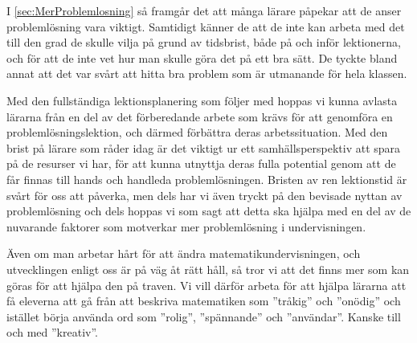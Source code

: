 
\textcolor{Mahogany}{
    I \ref{sec:MerProblemlosning} så framgår det att många lärare påpekar att de anser problemlösning vara viktigt. Samtidigt känner de att de inte kan arbeta med det till den grad de skulle vilja på grund av tidsbrist, både på och inför lektionerna, och för att de inte vet hur man skulle göra det på ett bra sätt. De tyckte bland annat att det var svårt att hitta bra problem som är utmanande för hela klassen. %
}

    \textcolor{lila}{Med den fullständiga lektionsplanering som följer med hoppas vi kunna avlasta lärarna från en del av det förberedande arbete som krävs för att genomföra en problemlösningslektion, och därmed förbättra deras arbetssituation. Med den brist på lärare som råder idag är det viktigt ur ett samhällsperspektiv att spara på de resurser vi har, för att kunna utnyttja deras fulla potential genom att de får finnas till hands och handleda problemlösningen. Bristen av ren lektionstid är svårt för oss att påverka, men dels har vi även tryckt på den bevisade nyttan av problemlösning och dels hoppas vi som sagt att detta ska hjälpa med en del av de nuvarande faktorer som motverkar mer problemlösning i undervisningen.}
    
    \textcolor{lila}{Även om man arbetar hårt för att ändra matematikundervisningen, och utvecklingen enligt oss är på väg åt rätt håll, så tror vi att det finns mer som kan göras för att hjälpa den på traven. Vi vill därför arbeta för att hjälpa lärarna att få eleverna att gå från att beskriva matematiken som ''tråkig'' och ''onödig'' och istället börja använda ord som ''rolig'', ''spännande'' och ''användar''. Kanske till och med ''kreativ''.}
    
